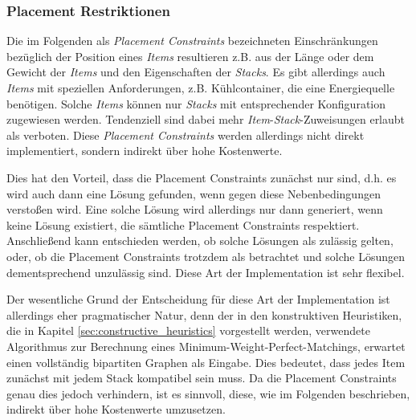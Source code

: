 \pagebreak

\subsubsection{Placement Restriktionen}
\label{sec:placement_restrictions}

Die im Folgenden als \textit{Placement Constraints} bezeichneten Einschränkungen bezüglich der Position eines \textit{Items} resultieren z.B.
aus der Länge oder dem Gewicht der \textit{Items} und den Eigenschaften der \textit{Stacks}. Es gibt allerdings auch \textit{Items} mit speziellen Anforderungen, z.B. Kühlcontainer, die eine Energiequelle benötigen. Solche \textit{Items} können nur \textit{Stacks} mit entsprechender Konfiguration zugewiesen werden. Tendenziell sind dabei mehr \textit{Item}-\textit{Stack}-Zuweisungen erlaubt als verboten. Diese \textit{Placement Constraints} werden allerdings nicht direkt implementiert, sondern indirekt über hohe Kostenwerte.

Dies hat den Vorteil, dass die Placement Constraints zunächst nur  sind, d.h. es wird auch
dann eine Lösung gefunden, wenn gegen diese Nebenbedingungen verstoßen wird. Eine solche Lösung wird allerdings nur dann generiert,
wenn keine Lösung existiert, die sämtliche Placement Constraints respektiert.
Anschließend kann entschieden werden, ob solche Lösungen als zulässig gelten, oder, ob die Placement Constraints trotzdem
als  betrachtet und solche Lösungen dementsprechend unzulässig sind. Diese Art der Implementation ist sehr flexibel.

Der wesentliche Grund der Entscheidung für diese Art der Implementation ist allerdings eher pragmatischer Natur, denn der in den konstruktiven Heuristiken, die in Kapitel \ref{sec:constructive_heuristics} vorgestellt werden, verwendete Algorithmus zur Berechnung eines Minimum-Weight-Perfect-Matchings, erwartet einen vollständig bipartiten Graphen als Eingabe. Dies bedeutet, dass jedes Item zunächst mit jedem Stack kompatibel sein muss. Da die Placement Constraints genau dies jedoch verhindern, ist es sinnvoll, diese, wie im Folgenden beschrieben, indirekt über hohe Kostenwerte umzusetzen.

